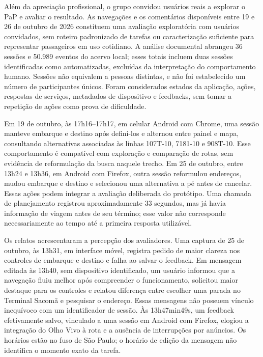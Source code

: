\documentclass[12pt,oneside,a4paper,brazil,chapter=TITLE]{abntex2}
\begin{document}
Além da apreciação profissional, o grupo convidou usuários reais a explorar o PaP e avaliar o resultado. As navegações e os comentários disponíveis entre 19 e 26 de outubro de 2026 constituem uma avaliação exploratória com usuários convidados, sem roteiro padronizado de tarefas ou caracterização suficiente para representar passageiros em uso cotidiano. A análise documental abrangeu 36 sessões e 50.989 eventos do acervo local; esses totais incluem duas sessões identificadas como automatizadas, excluídas da interpretação do comportamento humano. Sessões não equivalem a pessoas distintas, e não foi estabelecido um número de participantes únicos. Foram considerados estados da aplicação, ações, respostas de serviços, metadados de dispositivo e feedbacks, sem tomar a repetição de ações como prova de dificuldade.

Em 19 de outubro, às 17h16--17h17, em celular Android com Chrome, uma sessão manteve embarque e destino após defini-los e alternou entre painel e mapa, consultando alternativas associadas às linhas 107T-10, 7181-10 e 908T-10. Esse comportamento é compatível com exploração e comparação de rotas, sem evidência de reformulação da busca naquele trecho. Em 25 de outubro, entre 13h24 e 13h36, em Android com Firefox, outra sessão reformulou endereços, mudou embarque e destino e selecionou uma alternativa a pé antes de cancelar. Essas ações podem integrar a avaliação deliberada do protótipo. Uma chamada de planejamento registrou aproximadamente 33 segundos, mas já havia informação de viagem antes de seu término; esse valor não corresponde necessariamente ao tempo até a primeira resposta utilizável.

Os relatos acrescentaram a percepção dos avaliadores. Uma captura de 25 de outubro, às 13h31, em interface móvel, registra pedido de maior clareza nos controles de embarque e destino e falha ao salvar o feedback. Em mensagem editada às 13h40, sem dispositivo identificado, um usuário informou que a navegação fluiu melhor após compreender o funcionamento, solicitou maior destaque para os controles e relatou diferença entre escolher uma parada no Terminal Sacomã e pesquisar o endereço. Essas mensagens não possuem vínculo inequívoco com um identificador de sessão. Às 13h47min49s, um feedback efetivamente salvo, vinculado a uma sessão em Android com Firefox, elogiou a integração do Olho Vivo à rota e a ausência de interrupções por anúncios. Os horários estão no fuso de São Paulo; o horário de edição da mensagem não identifica o momento exato da tarefa.
\end{document}
